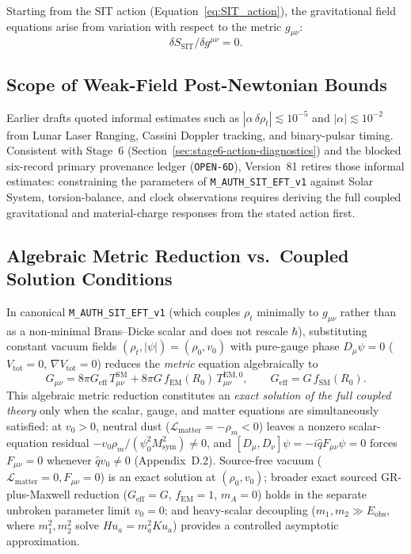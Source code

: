 Starting from the SIT action (Equation~\eqref{eq:SIT_action}), the gravitational field equations arise from variation with respect to the metric \(g_{\mu\nu}\):
\[
\delta S_{\mathrm{SIT}}/\delta g^{\mu\nu} = 0.
\]

\subsection{Scope of Weak-Field Post-Newtonian Bounds}

Earlier drafts quoted informal estimates such as $|\alpha\,\delta\rho_t| \lesssim 10^{-5}$ and $|\alpha| \lesssim 10^{-2}$ from Lunar Laser Ranging, Cassini Doppler tracking, and binary-pulsar timing. Consistent with Stage~6 (Section~\ref{sec:stage6-action-diagnostics}) and the blocked six-record primary provenance ledger (\texttt{OPEN-6D}), Version~81 retires those informal estimates: constraining the parameters of \texttt{M\_AUTH\_SIT\_EFT\_v1} against Solar System, torsion-balance, and clock observations requires deriving the full coupled gravitational and material-charge responses from the stated action first.

\subsection{Algebraic Metric Reduction vs.\ Coupled Solution Conditions}

In canonical \texttt{M\_AUTH\_SIT\_EFT\_v1} (which couples $\rho_t$ minimally to $g_{\mu\nu}$ rather than as a non-minimal Brans--Dicke scalar and does not rescale $\hbar$), substituting constant vacuum fields $(\rho_t, |\psi|) = (\rho_0, v_0)$ with pure-gauge phase $D_\mu\psi = 0$ ($V_{\mathrm{tot}} = 0$, $\nabla V_{\mathrm{tot}} = 0$) reduces the \emph{metric} equation algebraically to
\[
G_{\mu\nu} = 8\pi G_{\mathrm{eff}}\,T_{\mu\nu}^{\mathrm{SM}} + 8\pi G\,f_{\mathrm{EM}}(R_0)\,T_{\mu\nu}^{\mathrm{EM},0},
\qquad
G_{\mathrm{eff}} = G\,f_{\mathrm{SM}}(R_0).
\]
This algebraic metric reduction constitutes an \emph{exact solution of the full coupled theory} only when the scalar, gauge, and matter equations are simultaneously satisfied: at $v_0 > 0$, neutral dust ($\mathcal{L}_{\mathrm{matter}} = -\rho_m < 0$) leaves a nonzero scalar-equation residual $-v_0\rho_m/(\psi_0^2 M_{\mathrm{sym}}^2) \ne 0$, and $[D_\mu, D_\nu]\psi = -i\hat{q}F_{\mu\nu}\psi = 0$ forces $F_{\mu\nu} = 0$ whenever $\hat{q}v_0 \ne 0$ (Appendix~D.2). Source-free vacuum ($\mathcal{L}_{\mathrm{matter}} = 0, F_{\mu\nu} = 0$) is an exact solution at $(\rho_0, v_0)$; broader exact sourced GR-plus-Maxwell reduction ($G_{\mathrm{eff}} = G$, $f_{\mathrm{EM}} = 1$, $m_A = 0$) holds in the separate unbroken parameter limit $v_0 = 0$; and heavy-scalar decoupling ($m_1, m_2 \gg E_{\mathrm{obs}}$, where $m_1^2, m_2^2$ solve $H u_a = m_a^2 K u_a$) provides a controlled asymptotic approximation.

